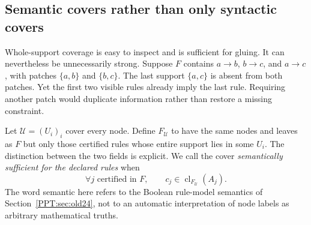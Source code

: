 \subsection{Semantic covers rather than only syntactic covers}
\label{PPT:sec:semantic-cover}

Whole-support coverage is easy to inspect and is sufficient for gluing. It can nevertheless be unnecessarily strong. Suppose $F$ contains $a\to b$, $b\to c$, and $a\to c$, with patches $\{a,b\}$ and $\{b,c\}$. The last support $\{a,c\}$ is absent from both patches. Yet the first two visible rules already imply the last rule. Requiring another patch would duplicate information rather than restore a missing constraint.

Let $\mathcal U=(U_i)_i$ cover every node. Define $F_{\mathcal U}$ to have the same nodes and leaves as $F$ but only those certified rules whose entire support lies in some $U_i$. The distinction between the two fields is explicit. We call the cover \emph{semantically sufficient for the declared rules} when
\[
 \forall j\text{ certified in }F,\qquad
 c_j\in\operatorname{cl}_{F_{\mathcal U}}(A_j).
 \tag{SC}\label{PPT:eq:semantic-cover}
\]
The word semantic here refers to the Boolean rule-model semantics of Section~\ref{PPT:sec:old24}, not to an automatic interpretation of node labels as arbitrary mathematical truths.

